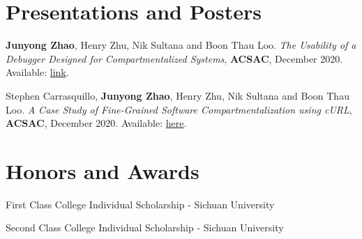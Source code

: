 \documentclass{article}
\begin{document}
\vspace{-2pt}
\section{Presentations and Posters}
\begin{description}[font=$\bullet$,leftmargin=!]
  \item \small{\textbf{Junyong Zhao}, Henry Zhu, Nik Sultana and Boon Thau Loo.
          \textit{The Usability of a Debugger Designed for Compartmentalized
            Systems}, \textbf{ACSAC}, December 2020. Available:
          \href{https://www.acsac.org/2020/program/poster-wips/2020-poster-09\%20The\%20Usability\%20of\%20a\%20Debugger\%20Designed\%20for\%20Compartmentalized\%20Systems.pdf}{link}.
        }
  \item \small{Stephen Carrasquillo, \textbf{Junyong Zhao}, Henry Zhu, Nik
          Sultana and Boon Thau Loo. \textit{A Case Study of Fine-Grained
            Software Compartmentalization using cURL}, \textbf{ACSAC}, December
          2020. Available:
          \href{https://www.acsac.org/2020/program/poster-wips/2020-poster-10-A\%20Case\%20Study\%20of\%20Fine-Grained\%20Software\%20Compartmentalization\%20using\%20cURL.pdf}{here}.
        }
\end{description}

\vspace{-2pt}
\section{Honors and Awards}
\begin{description}[font=$\bullet$]
  \item \small{First Class College Individual Scholarship - Sichuan University}
        \vspace{-5pt}
  \item \small{Second Class College Individual Scholarship - Sichuan University}
        \vspace{-5pt}
\end{description}
\end{document}
